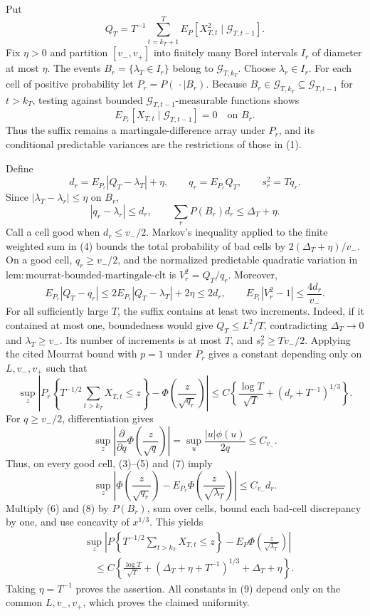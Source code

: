 Put
\[
 Q_T=T^{-1}\sum_{t=k_T+1}^T
 E_P[X_{T,t}^2\mid\mathcal G_{T,t-1}].
\tag{1}
\]
Fix \(\eta>0\) and partition \([v_-,v_+]\) into finitely many Borel
intervals \(I_r\) of diameter at most \(\eta\).  The events
\(B_r=\{\lambda_T\in I_r\}\) belong to \(\mathcal G_{T,k_T}\).  Choose
\(\lambda_r\in I_r\).  For each cell of positive probability let
\(P_r=P(\,\cdot\mid B_r)\).  Because
\(B_r\in\mathcal G_{T,k_T}\subseteq\mathcal G_{T,t-1}\) for \(t>k_T\),
testing against bounded \(\mathcal G_{T,t-1}\)-measurable functions shows
\[
 E_{P_r}[X_{T,t}\mid\mathcal G_{T,t-1}]=0
 \quad\text{on }B_r.
\tag{2}
\]
Thus the suffix remains a martingale-difference array under \(P_r\), and its
conditional predictable variances are the restrictions of those in (1).

Define
\[
 d_r=E_{P_r}|Q_T-\lambda_T|+\eta,
 \qquad q_r=E_{P_r}Q_T,
 \qquad s_r^2=Tq_r.
\tag{3}
\]
Since \(|\lambda_T-\lambda_r|\le\eta\) on \(B_r\),
\[
 |q_r-\lambda_r|\le d_r,
 \qquad
 \sum_rP(B_r)d_r\le\Delta_T+\eta.
\tag{4}
\]
Call a cell good when \(d_r\le v_-/2\).  Markov's inequality applied to the
finite weighted sum in (4) bounds the total probability of bad cells by
\(2(\Delta_T+\eta)/v_-\).  On a good cell, \(q_r\ge v_-/2\), and the
normalized predictable quadratic variation in
\(\mathrm{lem:mourrat\text{-}bounded\text{-}martingale\text{-}clt}\) is
\(V_r^2=Q_T/q_r\).  Moreover,
\[
 E_{P_r}|Q_T-q_r|
 \le2E_{P_r}|Q_T-\lambda_T|+2\eta\le2d_r,
 \qquad
 E_{P_r}|V_r^2-1|\le\frac{4d_r}{v_-}.
\tag{5}
\]
For all sufficiently large \(T\), the suffix contains at least two
increments.  Indeed, if it contained at most one, boundedness would give
\(Q_T\le L^2/T\), contradicting \(\Delta_T\to0\) and
\(\lambda_T\ge v_-\).  Its number of increments is at most \(T\), and
\(s_r^2\ge Tv_-/2\).  Applying the cited Mourrat bound with \(p=1\) under
\(P_r\) gives a constant depending only on \(L,v_-,v_+\) such that
\[
 \sup_z\left|P_r\!\left\{T^{-1/2}\sum_{t>k_T}X_{T,t}\le z\right\}
 -\Phi\!\left(\frac z{\sqrt{q_r}}\right)\right|
 \le C\left\{\frac{\log T}{\sqrt T}
 +(d_r+T^{-1})^{1/3}\right\}.
\tag{6}
\]
For \(q\ge v_-/2\), differentiation gives
\[
 \sup_z\left|\frac{\partial}{\partial q}
 \Phi\!\left(\frac z{\sqrt q}\right)\right|
 =\sup_u\frac{|u|\phi(u)}{2q}\le C_{v_-}.
\tag{7}
\]
Thus, on every good cell, (3)--(5) and (7) imply
\[
 \sup_z\left|\Phi\!\left(\frac z{\sqrt{q_r}}\right)
 -E_{P_r}\Phi\!\left(\frac z{\sqrt{\lambda_T}}\right)\right|
 \le C_{v_-}d_r.
\tag{8}
\]
Multiply (6) and (8) by \(P(B_r)\), sum over cells, bound each bad-cell
discrepancy by one, and use concavity of \(x^{1/3}\).  This yields
\[
 \begin{aligned}
 &\sup_z\left|P\!\left\{T^{-1/2}\sum_{t>k_T}X_{T,t}\le z\right\}
 -E_P\Phi\!\left(\frac z{\sqrt{\lambda_T}}\right)\right|\\
 &\quad\le C\left\{\frac{\log T}{\sqrt T}
 +(\Delta_T+\eta+T^{-1})^{1/3}+\Delta_T+\eta\right\}.
 \end{aligned}
\tag{9}
\]
Taking \(\eta=T^{-1}\) proves the assertion.  All constants in (9) depend
only on the common \(L,v_-,v_+\), which proves the claimed uniformity.